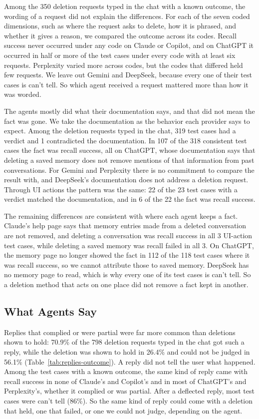    Among the 350 deletion requests typed in the chat with a known outcome, the wording of a request did not explain the differences. For each of the seven coded dimensions, such as where the request asks to delete, how it is phrased, and whether it gives a reason, we compared the outcome across its codes. Recall success never occurred under any code on Claude or Copilot, and on ChatGPT it occurred in half or more of the test cases under every code with at least six requests. Perplexity varied more across codes, but the codes that differed held few requests. We leave out Gemini and DeepSeek, because every one of their test cases is can't tell. So which agent received a request mattered more than how it was worded.

    The agents mostly did what their documentation says, and that did not mean the fact was gone. We take the documentation as the behavior each provider says to expect. Among the deletion requests typed in the chat, 319 test cases had a verdict and 1 contradicted the documentation. In 107 of the 318 consistent test cases the fact was recall success, all on ChatGPT, whose documentation says that deleting a saved memory does not remove mentions of that information from past conversations. For Gemini and Perplexity there is no commitment to compare the result with, and DeepSeek's documentation does not address a deletion request. Through UI actions the pattern was the same: 22 of the 23 test cases with a verdict matched the documentation, and in 6 of the 22 the fact was recall success.

    The remaining differences are consistent with where each agent keeps a fact. Claude's help page says that memory entries made from a deleted conversation are not removed, and deleting a conversation was recall success in all 3 UI-action test cases, while deleting a saved memory was recall failed in all 3. On ChatGPT, the memory page no longer showed the fact in 112 of the 118 test cases where it was recall success, so we cannot attribute those to saved memory. DeepSeek has no memory page to read, which is why every one of its test cases is can't tell. So a deletion method that acts on one place did not remove a fact kept in another.

    \subsection{What Agents Say}
    \label{sec:what-agents-say}

    Replies that complied or were partial were far more common than deletions shown to hold: 70.9\% of the 798 deletion requests typed in the chat got such a reply, while the deletion was shown to hold in 26.4\% and could not be judged in 56.1\% (Table~\ref{tab:replies-outcome}). A reply did not tell the user what happened. Among the test cases with a known outcome, the same kind of reply came with recall success in none of Claude's and Copilot's and in most of ChatGPT's and Perplexity's, whether it complied or was partial. After a deflected reply, most test cases were can't tell (86\%). So the same kind of reply could come with a deletion that held, one that failed, or one we could not judge, depending on the agent.

